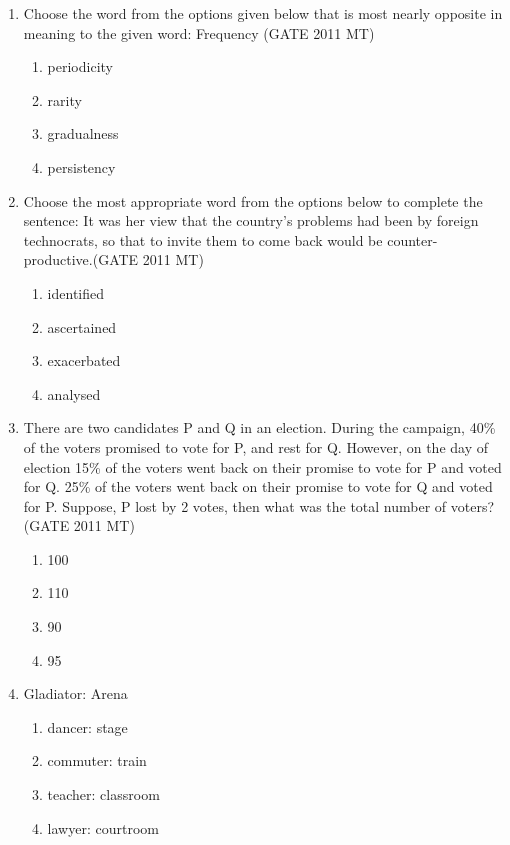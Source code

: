 \documentclass[12pt]{article}
\begin{document}
\begin{enumerate}
\item Choose the word from the options given below that is most nearly opposite in meaning to the given word: Frequency (GATE 2011 MT)
    \begin{enumerate}
        \item periodicity
        \item rarity
        \item gradualness
        \item persistency
    \end{enumerate}

\item Choose the most appropriate word from the options below to complete the sentence:
It was her view that the country's problems had been      by foreign technocrats, so that to invite them to come back would be counter-productive.(GATE 2011 MT)
    \begin{enumerate}
        \item identified
        \item ascertained
        \item exacerbated
        \item analysed
    \end{enumerate}

\item There are two candidates P and Q in an election. During the campaign, 40\% of the voters promised to vote for P, and rest for Q. However, on the day of election 15\% of the voters went back on their promise to vote for P and voted for Q. 25\% of the voters went back on their promise to vote for Q and voted for P. Suppose, P lost by 2 votes, then what was the total number of voters? (GATE 2011 MT)
    \begin{enumerate}
        \item 100
        \item 110
        \item 90
        \item 95
    \end{enumerate}

\item Gladiator: Arena
    \begin{enumerate}
        \item dancer: stage
        \item commuter: train
        \item teacher: classroom
        \item lawyer: courtroom
    \end{enumerate}


\end{enumerate}
\end{document}
